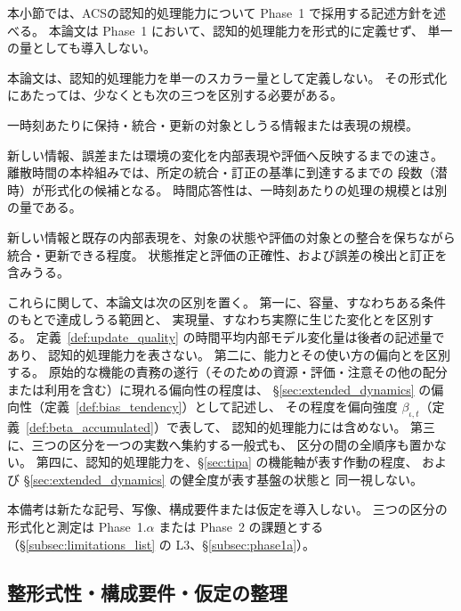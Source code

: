 本小節では、ACSの認知的処理能力について Phase~1 で採用する記述方針を述べる。
本論文は Phase~1 において、認知的処理能力を形式的に定義せず、
単一の量としても導入しない。

\begin{remark}[認知的処理能力の記述方針]
\label{rem:cognitive_capacity_policy}
本論文は、認知的処理能力を単一のスカラー量として定義しない。
その形式化にあたっては、少なくとも次の三つを区別する必要がある。

\begin{description}[style=nextline]
  \item[量的容量]
  一時刻あたりに保持・統合・更新の対象としうる情報または表現の規模。
  \item[時間応答性]
  新しい情報、誤差または環境の変化を内部表現や評価へ反映するまでの速さ。
  離散時間の本枠組みでは、所定の統合・訂正の基準に到達するまでの
  段数（潜時）が形式化の候補となる。
  時間応答性は、一時刻あたりの処理の規模とは別の量である。
  \item[統合の質]
  新しい情報と既存の内部表現を、対象の状態や評価の対象との整合を保ちながら
  統合・更新できる程度。
  状態推定と評価の正確性、および誤差の検出と訂正を含みうる。
\end{description}

これらに関して、本論文は次の区別を置く。
第一に、容量、すなわちある条件のもとで達成しうる範囲と、
実現量、すなわち実際に生じた変化とを区別する。
定義~\ref{def:update_quality} の時間平均内部モデル変化量は後者の記述量であり、
認知的処理能力を表さない。
第二に、能力とその使い方の偏向とを区別する。
原始的な機能の責務の遂行（そのための資源・評価・注意その他の配分または利用を含む）に現れる偏向性の程度は、
\S\ref{sec:extended_dynamics} の偏向性（定義~\ref{def:bias_tendency}）として記述し、
その程度を偏向強度 $\beta_{\iota,t}$（定義~\ref{def:beta_accumulated}）で表して、
認知的処理能力には含めない。
第三に、三つの区分を一つの実数へ集約する一般式も、
区分の間の全順序も置かない。
第四に、認知的処理能力を、\S\ref{sec:tipa} の機能軸が表す作動の程度、
および \S\ref{sec:extended_dynamics} の健全度が表す基盤の状態と
同一視しない。

本備考は新たな記号、写像、構成要件または仮定を導入しない。
三つの区分の形式化と測定は Phase~1.$\alpha$ または Phase~2 の課題とする
（\S\ref{subsec:limitations_list} の L3、\S\ref{subsec:phase1a}）。
\end{remark}

\subsection{整形式性・構成要件・仮定の整理}
\label{subsec:assumption_list_sec2}

